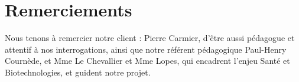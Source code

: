 \section{Remerciements}
Nous tenons à remercier notre client : Pierre Carmier, d'être aussi pédagogue et attentif à nos interrogations, ainsi que notre référent pédagogique Paul-Henry Cournède, et Mme Le Chevallier et Mme Lopes, qui encadrent l'enjeu Santé et Biotechnologies, et guident notre projet.